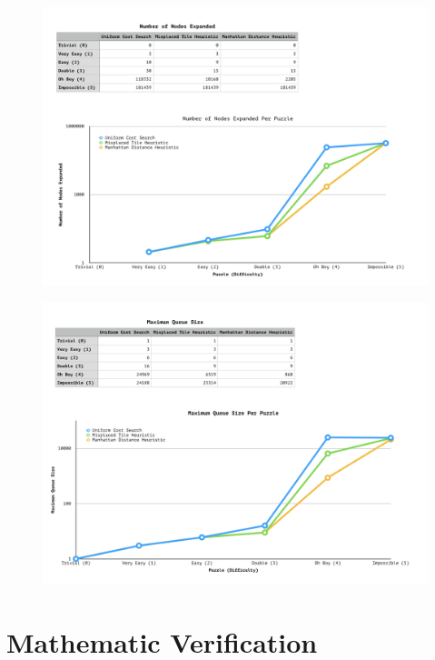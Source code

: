 \documentclass[a4paper]{article}
\begin{document}
\begin{figure}
  \centering
  \includegraphics[width=\paperwidth, angle=90]{Number Nodes Expanded.png}
  \label{Figure 1}
\end{figure}

\begin{figure}
  \centering
  \includegraphics[width=\paperwidth, angle=90]{Maximum Queue Size.png}
  \label{Figure 2}
\end{figure}

\section{Mathematic Verification} %
\end{document}
